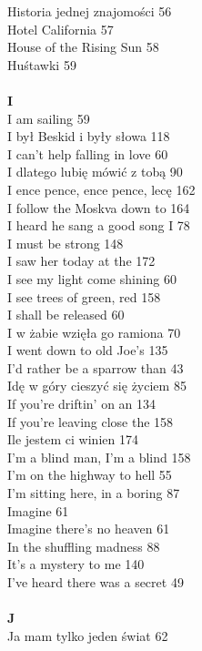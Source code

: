 \documentclass[a5paper, 10pt]{book}
\begin{document}
{\begin{multicols}{3}
    Historia jednej znajomości 56\\
    Hotel California 57\\
    House of the Rising Sun 58\\
    Huśtawki 59\\
    \\
    {\footnotesize \textbf{I\\} }
    I am sailing 59\\
    I był Beskid i były słowa 118\\
    I can't help falling in love 60\\
    I dlatego lubię mówić z tobą 90\\
    I ence pence, ence pence, lecę 162\\
    I follow the Moskva down to 164\\
    I heard he sang a good song I 78\\
    I must be strong 148\\
    I saw her today at the 172\\
    I see my light come shining 60\\
    I see trees of green, red 158\\
    I shall be released 60\\
    I w żabie wzięła go ramiona 70\\
    I went down to old Joe's 135\\
    I'd rather be a sparrow than 43\\
    Idę w góry cieszyć się życiem 85\\
    If you're driftin' on an 134\\
    If you're leaving close the 158\\
    Ile jestem ci winien 174\\
    I'm a blind man, I'm a blind 158\\
    I'm on the highway to hell 55\\
    I'm sitting here, in a boring 87\\
    Imagine 61\\
    Imagine there's no heaven 61\\
    In the shuffling madness 88\\
    It's a mystery to me 140\\
    I've heard there was a secret 49\\
    \\
    {\footnotesize \textbf{J\\} }
    Ja mam tylko jeden świat 62\\

\end{multicols}}
\end{document}
